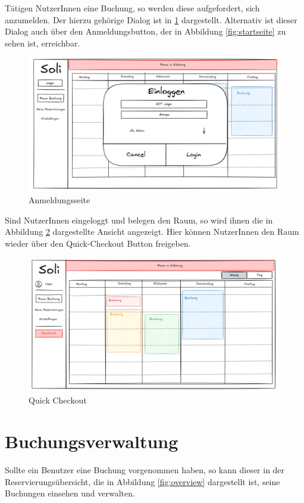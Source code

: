 Tätigen NutzerInnen eine Buchung, so werden diese aufgefordert, sich anzumelden.
Der hierzu gehörige Dialog ist in \ref{fig:login} dargestellt.
Alternativ ist dieser Dialog auch über den Anmeldungsbutton, der in Abbildung \ref{fig:startseite} zu sehen ist, erreichbar.
\begin{figure}[ht]
    \centering
    \includegraphics[scale=0.15]{figures/ui/anmeldungsseite}
    \caption{Anmeldungsseite}
    \label{fig:login}
\end{figure}
\clearpage

Sind NutzerInnen eingeloggt und belegen den Raum,
so wird ihnen die in Abbildung \ref{fig:checkout} dargestellte Ansicht angezeigt.
Hier können NutzerInnen den Raum wieder über den Quick-Checkout Button freigeben.
\begin{figure}[ht]
    \centering
    \includegraphics[scale=0.15]{figures/ui/checkout}
    \caption{Quick Checkout}
    \label{fig:checkout}
\end{figure}
\clearpage

\section{Buchungsverwaltung}
Sollte ein Benutzer eine Buchung vorgenommen haben, so kann dieser in der Reservierungsübersicht,
die in Abbildung \ref{fig:overview} dargestellt ist, seine Buchungen einsehen und verwalten.

